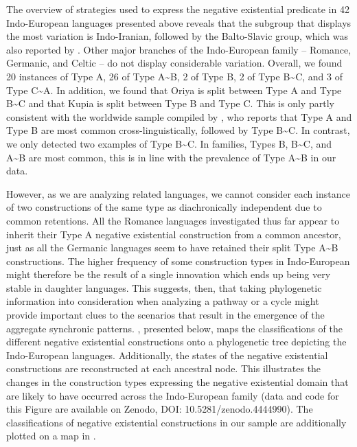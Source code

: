 \documentclass[output=paper]{langsci/langscibook}
\begin{document}
The overview of strategies used to express the negative existential
predicate in 42 Indo-European languages presented above reveals that the
subgroup that displays the most variation is Indo-Iranian, followed by the
Balto-Slavic group, which was also reported by \citet{Veselinova2014}.
Other major branches of the Indo-European family – Romance, Germanic, and
Celtic – do not display considerable variation. Overall, we found 20
instances of Type A, 26 of Type A{\textasciitilde}B, 2 of Type B, 2 of Type
B{\textasciitilde}C, and 3 of Type C{\textasciitilde}A. In addition, we
found that Oriya is split between Type A and Type B{\textasciitilde}C and
that Kupia is split between Type B and Type C. This is only partly
consistent with the worldwide sample compiled by
\citet[147]{Veselinova2016}, who reports that Type A and Type B are most
common cross-linguistically, followed by Type B{\textasciitilde}C. In
contrast, we only detected two examples of Type B{\textasciitilde}C. In
 families, Types B, B{\textasciitilde}C, and A{\textasciitilde}B are most common, this is in line with the prevalence of Type A{\textasciitilde}B in our data.

However, as we are analyzing related languages, we cannot consider each
instance of two constructions of the same type as diachronically
independent due to common retentions. All the Romance languages
investigated thus far appear to inherit their Type A negative existential
construction from a common ancestor, just as all the Germanic languages
seem to have retained their split Type A{\textasciitilde}B constructions.
The higher frequency of some construction types in Indo-European might
therefore be the result of a single innovation which ends up being very
stable in daughter languages. This suggests, then, that taking phylogenetic
information into consideration when analyzing a pathway or a cycle might
provide important clues to the scenarios that result in the emergence of
the aggregate synchronic patterns. , presented below,
maps the classifications of the different negative existential
constructions onto a phylogenetic tree depicting the Indo-European
languages. Additionally, the states of the negative existential
constructions are reconstructed at each ancestral node. This illustrates the changes in the construction types expressing the negative existential domain that are likely to have occurred across the Indo-European family (data and code for this Figure are available on Zenodo, DOI: 10.5281/zenodo.4444990). The classifications of negative existential constructions in our sample are additionally plotted on a map in .
\end{document}
